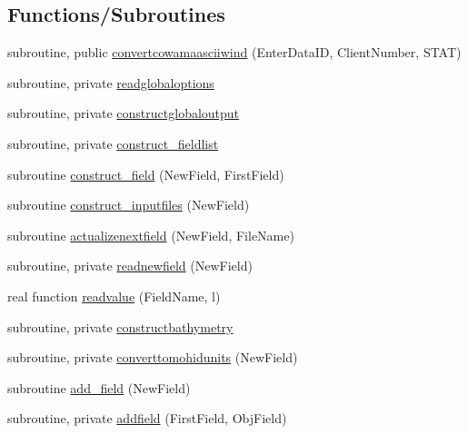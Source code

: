\subsection*{Functions/\+Subroutines}
\begin{DoxyCompactItemize}
\item 
subroutine, public \mbox{\hyperlink{namespacemodulecowamaasciiwind_a76bf63c9a36126aed55309270f63abe4}{convertcowamaasciiwind}} (Enter\+Data\+ID, Client\+Number, S\+T\+AT)
\item 
subroutine, private \mbox{\hyperlink{namespacemodulecowamaasciiwind_a8a6f6a971c31c5b3f8b965bb818c1cbc}{readglobaloptions}}
\item 
subroutine, private \mbox{\hyperlink{namespacemodulecowamaasciiwind_a52864e15417a95bd07a7bac59fc24b28}{constructglobaloutput}}
\item 
subroutine, private \mbox{\hyperlink{namespacemodulecowamaasciiwind_a473204a88af20d0403e8a3f6d6230232}{construct\+\_\+fieldlist}}
\item 
subroutine \mbox{\hyperlink{namespacemodulecowamaasciiwind_a661012c07a9e926668c44de9bfc8e1ae}{construct\+\_\+field}} (New\+Field, First\+Field)
\item 
subroutine \mbox{\hyperlink{namespacemodulecowamaasciiwind_ab2311b5176ff0df25428cb105c33cf81}{construct\+\_\+inputfiles}} (New\+Field)
\item 
subroutine \mbox{\hyperlink{namespacemodulecowamaasciiwind_a267c21bbee12efe50d8afcde5075671c}{actualizenextfield}} (New\+Field, File\+Name)
\item 
subroutine, private \mbox{\hyperlink{namespacemodulecowamaasciiwind_a34be2c2a2675d82ce063773657b99a0a}{readnewfield}} (New\+Field)
\item 
real function \mbox{\hyperlink{namespacemodulecowamaasciiwind_a3e1412f70915d204c75940a89c18a417}{readvalue}} (Field\+Name, l)
\item 
subroutine, private \mbox{\hyperlink{namespacemodulecowamaasciiwind_a1fde1515d3a9c4b1b2737393842f1f39}{constructbathymetry}}
\item 
subroutine, private \mbox{\hyperlink{namespacemodulecowamaasciiwind_abd7579d6017af5f1f691051cd07a84a5}{converttomohidunits}} (New\+Field)
\item 
subroutine \mbox{\hyperlink{namespacemodulecowamaasciiwind_ac11c8ada96001555421156bb05d44db1}{add\+\_\+field}} (New\+Field)
\item 
subroutine, private \mbox{\hyperlink{namespacemodulecowamaasciiwind_a340e2d839a8a04ceb31a4beae499e21a}{addfield}} (First\+Field, Obj\+Field)

\end{DoxyCompactItemize}
